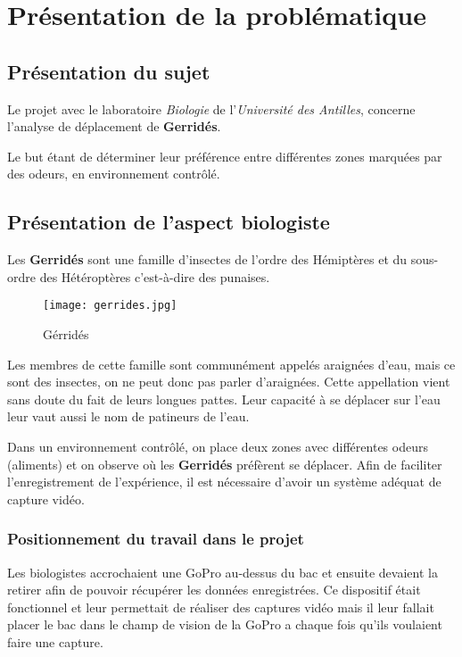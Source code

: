 \chapter{Présentation de la problématique}
    \label{Chapitre 3}
    \section{Présentation du sujet}
    Le projet avec le laboratoire \textit{Biologie} de l'\textit{Université des Antilles}, concerne l'analyse de déplacement de \textbf{Gerridés}.

    Le but étant de déterminer leur préférence entre différentes zones marquées par des odeurs, en environnement contrôlé.


    \section{Présentation de l'aspect biologiste}
    Les \textbf{Gerridés} sont une famille d'insectes de l'ordre des Hémiptères et du sous-ordre des Hétéroptères c'est-à-dire des punaises.
    \begin{figure}[ht]
        \centering
        \texttt{[image: gerrides.jpg]}
        \caption{Gérridés}        
    \end{figure}

    \vspace{0.1cm}

    
    Les membres de cette famille sont communément appelés araignées d’eau, mais ce sont des insectes, on ne peut donc pas parler d'araignées. Cette appellation vient sans doute du fait de leurs longues pattes. Leur capacité à se déplacer sur l'eau leur vaut aussi le nom de patineurs de l'eau.

    Dans un environnement contrôlé, on place deux zones avec différentes odeurs (aliments) et on observe où les \textbf{Gerridés} préfèrent se déplacer. Afin de faciliter l'enregistrement de l'expérience, il est nécessaire d'avoir un système adéquat de capture vidéo.
     
    \subsection{Positionnement du travail dans le projet}
        Les biologistes accrochaient une GoPro au-dessus du bac et ensuite devaient la retirer afin de pouvoir récupérer les données enregistrées. Ce dispositif était fonctionnel et leur permettait de réaliser des captures vidéo mais il leur fallait placer le bac dans le champ de vision de la GoPro a chaque fois qu'ils voulaient faire une capture.



